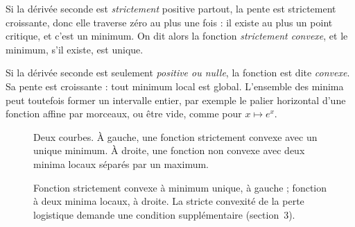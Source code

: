 Si la dérivée seconde est \emph{strictement} positive partout, la pente est
strictement croissante, donc elle traverse zéro au plus une fois : il existe au
plus un point critique, et c'est un minimum. On dit alors la fonction
\emph{strictement convexe}, et le minimum, s'il existe, est unique.

Si la dérivée seconde est seulement \emph{positive ou nulle}, la fonction est
dite \emph{convexe}. Sa pente est croissante : tout minimum local est global.
L'ensemble des minima peut toutefois former un intervalle entier, par exemple le
palier horizontal d'une fonction affine par morceaux, ou être vide, comme pour
$x\mapsto e^{x}$.

\begin{figure}[htbp]
\centering
\begin{graphique}{Deux courbes. À gauche, une fonction strictement convexe avec un unique minimum. À droite, une fonction non convexe avec deux minima locaux séparés par un maximum.}
\begin{minipage}[t]{.48\textwidth}
\centering
{}
\end{minipage}\hfill
\begin{minipage}[t]{.48\textwidth}
\centering
{}
\end{minipage}
\end{graphique}
\caption{Fonction strictement convexe à minimum unique, à gauche ; fonction à
deux minima locaux, à droite. La stricte convexité de la perte logistique
demande une condition supplémentaire (section~3).}
\label{fig:convexe}
\end{figure}

